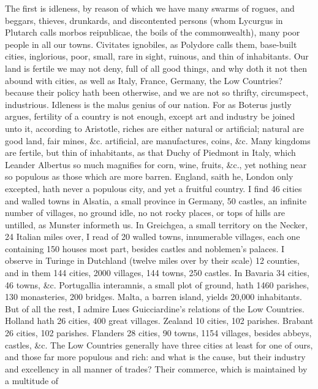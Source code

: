 {The first is idleness, by reason of which we have many swarms of
rogues, and beggars, thieves, drunkards, and discontented persons (whom
Lycurgus in Plutarch calls morbos reipublicae, the boils of the
commonwealth), many poor people in all our towns. Civitates ignobiles,
as Polydore calls them, base-built cities, inglorious, poor,
small, rare in sight, ruinous, and thin of inhabitants. Our land is
fertile we may not deny, full of all good things, and why doth it not
then abound with cities, as well as Italy, France, Germany, the Low
Countries? because their policy hath been otherwise, and we are not so
thrifty, circumspect, industrious. Idleness is the malus genius of our
nation. For as Boterus justly argues, fertility of a country is
not enough, except art and industry be joined unto it, according to
Aristotle, riches are either natural or artificial; natural are good
land, fair mines, \&c. artificial, are manufactures, coins, \&c. Many
kingdoms are fertile, but thin of inhabitants, as that Duchy of
Piedmont in Italy, which Leander Albertus so much magnifies for corn,
wine, fruits, \&c., yet nothing near so populous as those which are more
barren. England, saith he, London only excepted, hath never a
populous city, and yet a fruitful country. I find 46 cities and walled
towns in Alsatia, a small province in Germany, 50 castles, an infinite
number of villages, no ground idle, no not rocky places, or tops of
hills are untilled, as Munster informeth us. In Greichgea, a
small territory on the Necker, 24 Italian miles over, I read of 20
walled towns, innumerable villages, each one containing 150 houses most
part, besides castles and noblemen's palaces. I observe in Turinge
in Dutchland (twelve miles over by their scale) 12 counties, and in
them 144 cities, 2000 villages, 144 towns, 250 castles. In Bavaria
34 cities, 46 towns, \&c. Portugallia interamnis, a small plot of
ground, hath 1460 parishes, 130 monasteries, 200 bridges. Malta, a
barren island, yields 20,000 inhabitants. But of all the rest, I admire
Lues Guicciardine's relations of the Low Countries. Holland hath 26
cities, 400 great villages. Zealand 10 cities, 102 parishes. Brabant 26
cities, 102 parishes. Flanders 28 cities, 90 towns, 1154 villages,
besides abbeys, castles, \&c. The Low Countries generally have three
cities at least for one of ours, and those far more populous and rich:
and what is the cause, but their industry and excellency in all manner
of trades? Their commerce, which is maintained by a multitude of
}
